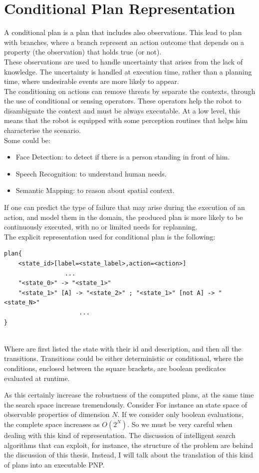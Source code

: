 \documentclass[pdftex,12pt,a4paper]{report}
\begin{document}
\section{Conditional Plan Representation}\label{cp_representation}
A conditional plan is a plan that includes also observations.
This lead to plan with branches, where a branch represent an action outcome that depends on a property (the observation) that holds true (or not). \\
These observations are used to handle uncertainty that arises from the lack of knowledge. The uncertainty is handled at execution time, rather than a planning time, where undesirable events are more likely to appear.\\
The conditioning on actions can remove threats by separate the contexts, through the use of conditional or sensing operators.
These operators help the robot to disambiguate the context and must be always executable. At a low level, this means that the robot is equipped with some perception routines that helps him characterise the scenario.\\
Some could be:
\begin{itemize}
\item Face Detection: to detect if there is a person standing in front of him.
\item Speech Recognition: to understand human needs.
\item Semantic Mapping: to reason about spatial context.
\end{itemize} 
If one can predict the type of failure that may arise during the execution of an action, and model them in the domain, the produced plan is more likely to be continuously executed, with no or limited needs for replanning.\\
The explicit representation used for conditional plan is the following:
\begin{verbatim}
plan{
    <state_id>[label=<state_label>,action=<action>]
                 ...
    "<state_0>" -> "<state_1>"
    "<state_1>" [A] -> "<state_2>" ; "<state_1>" [not A] -> "<state_N>"
                     ...
}
\end{verbatim}\\
Where are first listed the state with their id and description, and then all the transitions. Transitions could be either deterministic or conditional, where the conditions, enclosed between the square brackets, are boolean predicates evaluated at runtime.

\noindent As this certainly increase the robustness of the computed plans, at the same time the search space increase tremendously. Consider For instance an state space of observable properties of dimension $N$. If we consider only boolean evaluations, the complete space increases as $O(2^N)$. So we must be very careful when dealing with this kind of representation. The discussion of intelligent search algorithms that can exploit, for instance, the structure of the problem are behind the discussion of this thesis. Instead, I will talk about the translation of this kind of plans into an executable PNP.
\end{document}
